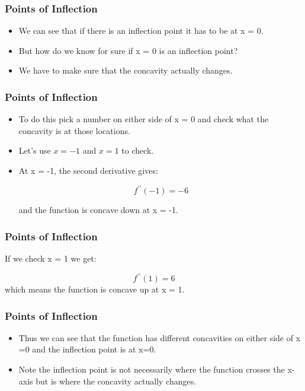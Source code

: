 \documentclass{beamer}
\begin{document}
\begin{frame}
	\frametitle{Points of Inflection}
	\begin{itemize}
		\item We can see that if there is an inflection point it has to be at x = 0. 
		\item But how do we know for sure if x = 0 is an inflection point? 
		\item We have to make sure that the concavity actually changes. 
	\end{itemize}
\end{frame}
\begin{frame}
	\frametitle{Points of Inflection}
	\begin{itemize}
		\item To do this pick a number on either side of x = 0 and check what the concavity is at those locations. 
		\item Let's use $x = -1$ and $x = 1$ to check. 
		\item At x = -1, the second derivative gives:
		
		\[f^{\prime \prime}(-1) = -6 \]
		
		and the function is concave down at x = -1. 
	\end{itemize}
\end{frame}
\begin{frame}
	\frametitle{Points of Inflection}
	If we check x = 1 we get:
	
	
	\[f^{\prime \prime}(1) = 6 \]
	which means the function is concave up at x = 1.
	
\end{frame}
\begin{frame}
	\frametitle{Points of Inflection}
	\begin{itemize}
		\item Thus we can see that the function has different concavities on either side of x =0 and the inflection point is at x=0. 
		\item 
		Note the inflection point is not necessarily where the function crosses the x-axis but is where the concavity actually changes.
	\end{itemize}
\end{frame}
\end{document}
